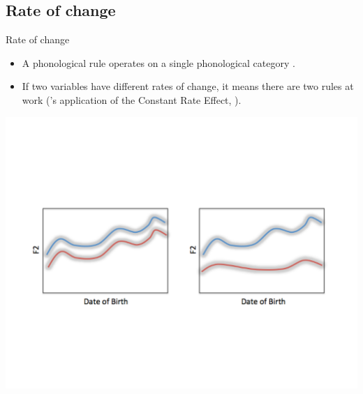 \documentclass[hyperref={pdfpagelabels=false}]{beamer}
\begin{document}
%
%

\subsection{Rate of change}
\begin{frame}{Rate of change}
	\begin{itemize} 
		\item A phonological rule operates on a single phonological category \citep{fruehwald2013}. \pause
		\item If two variables have different rates of change, it means there are two rules at work (\citealt{fruehwald2013}'s application of the Constant Rate Effect, \citealt{kroch1989}). \pause

	\end{itemize}
	\begin{center}

	\includegraphics[trim=2cm 2cm 2cm 6cm, clip=true, width=1\textwidth]{RateofChangeEx.pdf}

\end{center}\end{frame}
\end{document}

